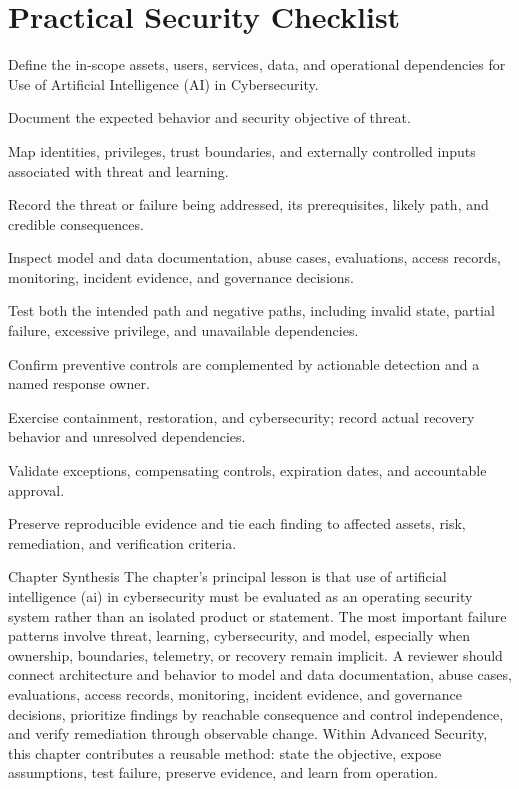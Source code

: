 \documentclass[11pt,letterpaper]{article}
\begin{document}
\section*{Practical Security Checklist}
\begin{CornellChecklist}
\item Define the in-scope assets, users, services, data, and operational dependencies for Use of Artificial Intelligence (AI) in Cybersecurity.
\item Document the expected behavior and security objective of threat.
\item Map identities, privileges, trust boundaries, and externally controlled inputs associated with threat and learning.
\item Record the threat or failure being addressed, its prerequisites, likely path, and credible consequences.
\item Inspect model and data documentation, abuse cases, evaluations, access records, monitoring, incident evidence, and governance decisions.
\item Test both the intended path and negative paths, including invalid state, partial failure, excessive privilege, and unavailable dependencies.
\item Confirm preventive controls are complemented by actionable detection and a named response owner.
\item Exercise containment, restoration, and cybersecurity; record actual recovery behavior and unresolved dependencies.
\item Validate exceptions, compensating controls, expiration dates, and accountable approval.
\item Preserve reproducible evidence and tie each finding to affected assets, risk, remediation, and verification criteria.
\end{CornellChecklist}
\begin{CornellSummaryBox}{Chapter Synthesis}
The chapter's principal lesson is that use of artificial intelligence (ai) in cybersecurity must be evaluated as an operating security system rather than an isolated product or statement. The most important failure patterns involve threat, learning, cybersecurity, and model, especially when ownership, boundaries, telemetry, or recovery remain implicit. A reviewer should connect architecture and behavior to model and data documentation, abuse cases, evaluations, access records, monitoring, incident evidence, and governance decisions, prioritize findings by reachable consequence and control independence, and verify remediation through observable change. Within Advanced Security, this chapter contributes a reusable method: state the objective, expose assumptions, test failure, preserve evidence, and learn from operation.
\end{CornellSummaryBox}
\end{document}
